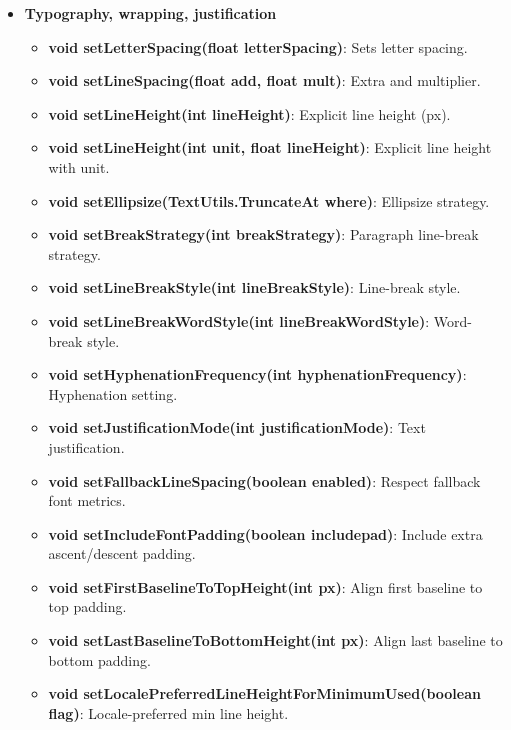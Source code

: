 \documentclass{report}
\begin{document}
\begin{itemize}
\begin{itemize}
        \item \textbf{Typography, wrapping, justification}
            \begin{itemize}
                \item \textbf{void setLetterSpacing(float letterSpacing)}: Sets letter spacing.
                \item \textbf{void setLineSpacing(float add, float mult)}: Extra and multiplier.
                \item \textbf{void setLineHeight(int lineHeight)}: Explicit line height (px).
                \item \textbf{void setLineHeight(int unit, float lineHeight)}: Explicit line height with unit.
                \item \textbf{void setEllipsize(TextUtils.TruncateAt where)}: Ellipsize strategy.
                \item \textbf{void setBreakStrategy(int breakStrategy)}: Paragraph line-break strategy.
                \item \textbf{void setLineBreakStyle(int lineBreakStyle)}: Line-break style.
                \item \textbf{void setLineBreakWordStyle(int lineBreakWordStyle)}: Word-break style.
                \item \textbf{void setHyphenationFrequency(int hyphenationFrequency)}: Hyphenation setting.
                \item \textbf{void setJustificationMode(int justificationMode)}: Text justification.
                \item \textbf{void setFallbackLineSpacing(boolean enabled)}: Respect fallback font metrics.
                \item \textbf{void setIncludeFontPadding(boolean includepad)}: Include extra ascent/descent padding.
                \item \textbf{void setFirstBaselineToTopHeight(int px)}: Align first baseline to top padding.
                \item \textbf{void setLastBaselineToBottomHeight(int px)}: Align last baseline to bottom padding.
                \item \textbf{void setLocalePreferredLineHeightForMinimumUsed(boolean flag)}: Locale-preferred min line height.
            \end{itemize}


\end{itemize}
\end{itemize}
\end{document}
